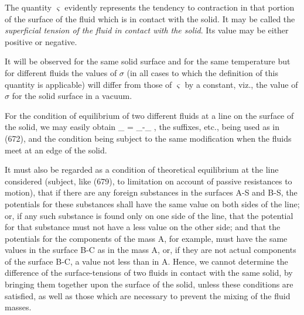 \documentclass[12pt]{memoir}
\begin{document}
The quantity $\varsigma$ evidently represents the tendency to contraction in that portion of the surface of the fluid which is in contact with the solid. It may be called the \textit{superficial tension of the fluid in contact with the solid}. Its value may be either positive or negative.

It will be observed for the same solid surface and for the same temperature but for different fluids the values of $\sigma$ (in all cases to which the definition of this quantity is applicable) will differ from those of $\varsigma$ by a constant, viz., the value of $\sigma$ for the solid surface in a vacuum.

For the condition of equilibrium of two different fluids at a line on the surface of the solid, we may easily obtain
\eqs \sigma_{} \cos \alpha = \varsigma_{}-\varsigma_{}  ,  \label{679}\eqe
the suffixes, etc., being used as in (672), and the condition being subject to the same modification when the fluids meet at an edge of the solid.

It must also be regarded as a condition of theoretical equilibrium at the line considered (subject, like (679), to limitation on account of passive resistances to motion), that if there are any foreign substances in the surfaces A-S and B-S, the potentials for these substances shall have the same value on both sides of the line; or, if any such substance is found only on one side of the line, that the potential for that substance must not have a less value on the other side; and that the potentials for the components of the mass A, for example, must have the same values in the surface B-C as in the mass A, or, if they are not actual components of the surface B-C, a value not less than in A. Hence, we cannot determine the difference of the surface-tensions of two fluids in contact with the same solid, by bringing them together upon the surface of the solid, unless these conditions are satisfied, as well as those which are necessary to prevent the mixing of the fluid masses.
\end{document}
